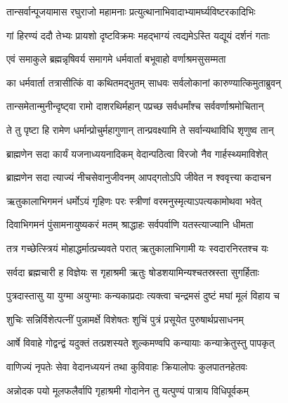 \twolineshloka
{तान्सर्वान्पूजयामास रघुराजो महामनाः}
{प्रत्युत्थानाभिवादाभ्यामर्घ्यविष्टरकादिभिः}%

\twolineshloka
{गां हिरण्यं ददौ तेभ्यः प्रायशो दृष्टविक्रमः}
{महद्भाग्यं त्वद्यमेऽस्ति यद्यूयं दर्शनं गताः}%


\twolineshloka
{एवं समाकुले ब्रह्मन्नृषिवर्य समागमे}
{धर्मवार्ता बभूवाहो वर्णाश्रमसुसम्मता}%


\twolineshloka
{का धर्मवार्ता तत्रासीत्किं वा कथितमद्भुतम्}
{साधवः सर्वलोकानां कारुण्यात्किमुताब्रुवन्}%


\twolineshloka
{तान्समेतान्मुनीन्दृष्ट्वा रामो दाशरथिर्महान्}
{पप्रच्छ सर्वधर्मांश्च सर्ववर्णाश्रमोचितान्}%

\twolineshloka
{ते तु पृष्टा हि रामेण धर्मान्प्रोचुर्महागुणान्}
{तान्प्रवक्ष्यामि ते सर्वान्यथाविधि शृणुष्व तान्}%


\twolineshloka
{ब्राह्मणेन सदा कार्यं यजनाध्ययनादिकम्}
{वेदान्पठित्वा विरजो नैव गार्हस्थ्यमाविशेत्}%

\twolineshloka
{ब्राह्मणेन सदा त्याज्यं नीचसेवानुजीवनम्}
{आपद्गतोऽपि जीवेत न श्ववृत्त्या कदाचन}%

\twolineshloka
{ऋतुकालाभिगमनं धर्मोऽयं गृहिणः परः}
{स्त्रीणां वरमनुस्मृत्याऽपत्यकामोथवा भवेत्}%

\twolineshloka
{दिवाभिगमनं पुंसामनायुष्यकरं मतम्}
{श्राद्धाहः सर्वपर्वाणि यतस्त्याज्यानि धीमता}%

\twolineshloka
{तत्र गच्छेत्स्त्रियं मोहाद्धर्मात्प्रच्यवते परात्}
{ऋतुकालाभिगामी यः स्वदारनिरतश्च यः}%

\twolineshloka
{सर्वदा ब्रह्मचारी ह विज्ञेयः स गृहाश्रमी}
{ऋतुः षोडशयामिन्यश्चतस्रस्ता सुगर्हिताः}%

\twolineshloka
{पुत्रदास्तासु या युग्मा अयुग्माः कन्यकाप्रदाः}
{त्यक्त्वा चन्द्रमसं दुष्टं मघां मूलं विहाय च}%

\twolineshloka
{शुचिः सन्निर्विशेत्पत्नीं पुन्नामर्क्षे विशेषतः}
{शुचिं पुत्रं प्रसूयेत पुरुषार्थप्रसाधनम्}%

\twolineshloka
{आर्षे विवाहे गोद्वन्द्वं यदुक्तं तत्प्रशस्यते}
{शुल्कमण्वपि कन्यायाः कन्याक्रेतुस्तु पापकृत्}%

\twolineshloka
{वाणिज्यं नृपतेः सेवा वेदानध्ययनं तथा}
{कुविवाहः क्रियालोपः कुलपातनहेतवः}%

\twolineshloka
{अन्नोदक पयो मूलफलैर्वापि गृहाश्रमी}
{गोदानेन तु यत्पुण्यं पात्राय विधिपूर्वकम्}%

